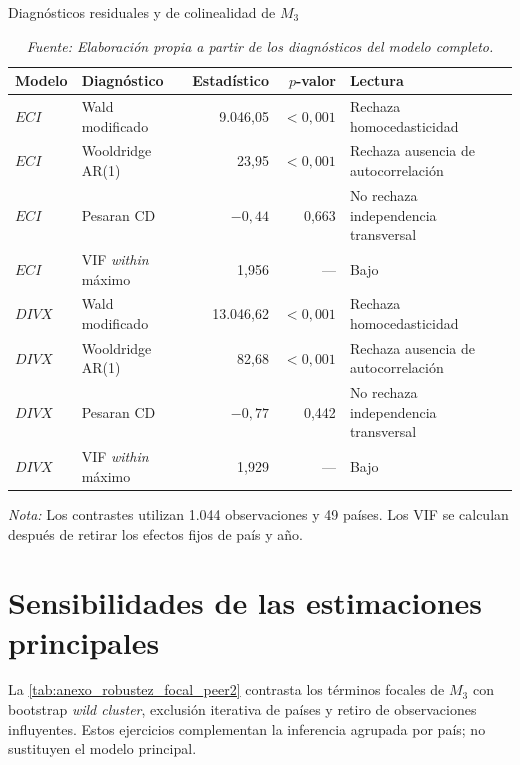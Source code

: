 \documentclass[../../TFM.tex]{subfiles}
\begin{document}
	\begin{table}[htbp]
		\centering
		\small
		\caption{Diagnósticos residuales y de colinealidad de $M_3$}
		\label{tab:anexo_diagnosticos_m3_peer2}
		\begin{adjustbox}{max width=\textwidth}
		\begin{tabular}{llrrl}
			\toprule
			Modelo & Diagnóstico & Estadístico & $p$-valor & Lectura \\
			\midrule
			$ECI$ & Wald modificado & 9.046,05 & $<0,001$ & Rechaza homocedasticidad \\
			$ECI$ & Wooldridge AR(1) & 23,95 & $<0,001$ & Rechaza ausencia de autocorrelación \\
			$ECI$ & Pesaran CD & $-0,44$ & 0,663 & No rechaza independencia transversal \\
			$ECI$ & VIF \textit{within} máximo & 1,956 & --- & Bajo \\
			\addlinespace
			$DIVX$ & Wald modificado & 13.046,62 & $<0,001$ & Rechaza homocedasticidad \\
			$DIVX$ & Wooldridge AR(1) & 82,68 & $<0,001$ & Rechaza ausencia de autocorrelación \\
			$DIVX$ & Pesaran CD & $-0,77$ & 0,442 & No rechaza independencia transversal \\
			$DIVX$ & VIF \textit{within} máximo & 1,929 & --- & Bajo \\
			\bottomrule
		\end{tabular}
		\end{adjustbox}
		\caption*{\footnotesize \textit{Nota:} Los contrastes utilizan 1.044 observaciones y 49 países. Los VIF se calculan después de retirar los efectos fijos de país y año.}
		\caption*{\footnotesize \textit{Fuente: Elaboración propia a partir de los diagnósticos del modelo completo.}}
	\end{table}

	\section{Sensibilidades de las estimaciones principales}
	\label{sec:anexo_sensibilidades_peer2}

	La \autoref{tab:anexo_robustez_focal_peer2} contrasta los términos focales de
	$M_3$ con bootstrap \textit{wild cluster}, exclusión iterativa de países y
	retiro de observaciones influyentes. Estos ejercicios complementan la
	inferencia agrupada por país; no sustituyen el modelo principal.
\end{document}
